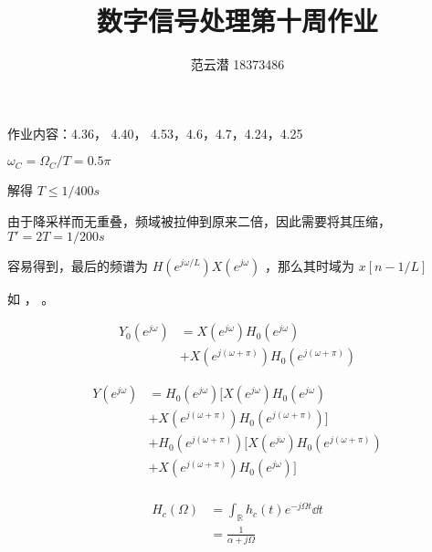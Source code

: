 \documentclass[lang=cn,11pt,a4paper,cite=authoryear,twocolumn]{elegantpaper}
\title{数字信号处理\quad 第十周作业}
\author{范云潜 18373486}
\institute{微电子学院 184111 班}
\date{\zhtoday}
\begin{document}
\maketitle

作业内容：4.36， 4.40， 4.53，4.6，4.7，4.24，4.25




\(\omega_C = \Omega_C / T = 0.5 \pi\) 

解得 \(T \leq 1/400 s\) 


由于降采样而无重叠，频域被拉伸到原来二倍，因此需要将其压缩， \(T' = 2 T = 1 / 200 s\) 


容易得到，最后的频谱为 \(H(e^{j \omega / L}) X(e^{j\omega})\) ，那么其时域为 \(x[n - 1 / L]\) 



如  ，  。



\[\begin{aligned}
    Y_0(e^{j\omega}) &= X(e^{j\omega}) H_0(e^{j\omega}) \\
    &+ X(e^{j(\omega + \pi )}) H_0 (e^{j(\omega + \pi)})
\end{aligned}\]


\[\begin{aligned}
    Y(e^{j\omega}) &=  H_0(e^{j\omega})[X(e^{j\omega}) H_0(e^{j\omega}) \\
    &+ X(e^{j(\omega + \pi )}) H_0 (e^{j(\omega + \pi)})] \\ 
    &+  H_0(e^{j(\omega+\pi)})[X(e^{j\omega}) H_0(e^{j(\omega+\pi)}) \\
    &+ X(e^{j(\omega + \pi )}) H_0 (e^{j\omega})] \\ 
\end{aligned}\]





\[\begin{aligned}
    H_c(\Omega) &= \int_\mathbb{R} h_c(t) e^{-j\Omega t} \dd{t} \\ 
    &= \frac{1}{\alpha + j \Omega}
\end{aligned}\]
\end{document}
